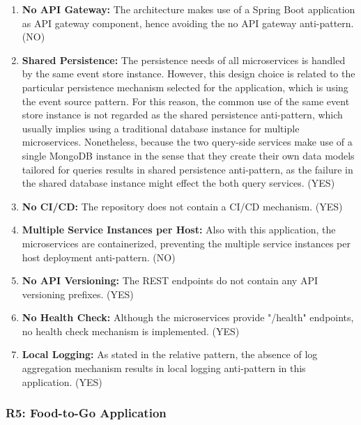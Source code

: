 \documentclass{Configuration_Files/PoliMi3i_thesis}
\begin{document}
\begin{enumerate}
    \item \textbf{No API Gateway:} The architecture makes use of a Spring Boot application as API gateway component, hence avoiding the no API gateway anti-pattern. (NO)
    
    \item \textbf{Shared Persistence:} The persistence needs of all microservices is handled by the same event store instance.
    However, this design choice is related to the particular persistence mechanism selected for the application, which is using the event source pattern.
    For this reason, the common use of the same event store instance is not regarded as the shared persistence anti-pattern, which usually implies using a traditional database instance for multiple microservices. 
    Nonetheless, because the two query-side services make use of a single MongoDB instance in the sense that they create their own data models tailored for queries results in shared persistence anti-pattern, as the failure in the shared database instance might effect the both query services. (YES)
    
    \item \textbf{No CI/CD:} The repository does not contain a CI/CD mechanism. (YES)
    
    \item \textbf{Multiple Service Instances per Host:} Also with this application, the microservices are containerized, preventing the multiple service instances per host deployment anti-pattern. (NO)
    
    \item \textbf{No API Versioning:} The REST endpoints do not contain any API versioning prefixes. (YES)
    
    \item \textbf{No Health Check:} Although the microservices provide "/health" endpoints, no health check mechanism is implemented. (YES)
    
    \item \textbf{Local Logging:} As stated in the relative pattern, the absence of log aggregation mechanism results in local logging anti-pattern in this application. (YES)
    
\end{enumerate}

\subsubsection{R5: Food-to-Go Application}
\label{subsubsec:R5}
\end{document}
